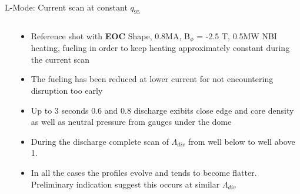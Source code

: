 \documentclass[10pt, compress]{beamer}
\newcommand\Fontvi{\fontsize{8}{7.2}\selectfont}
\begin{document}
\begin{frame}{L-Mode: Current scan at constant $q_{95}$}
\Fontvi
  \vspace{-1cm}
\begin{columns}
  \begin{column}{0.65\textwidth}
  \end{column}
  \begin{column}{0.35\textwidth}
    \begin{itemize}
      \item Reference shot with \textbf{EOC} Shape, 0.8MA, B$_{\phi}$ = -2.5 T, 0.5MW NBI heating,
        fueling in order to keep heating approximately constant during
        the current scan
      \item<2-> The fueling has been reduced at lower current for not
        encountering disruption too early
      \item<3-> Up to 3 seconds 0.6 and 0.8 discharge exibits close
        edge and core density as well as neutral pressure from gauges
        under the dome
      \item<4-> During the discharge complete scan of $\Lambda_{div}$
        from well below to well above 1.
      \item<5> In all the cases the profiles evolve and tends to
        become flatter. Preliminary indication suggest this occurs at
        similar $\Lambda_{div}$
    \end{itemize}
  
  \end{column}
\end{columns}
\end{frame}
\end{document}
